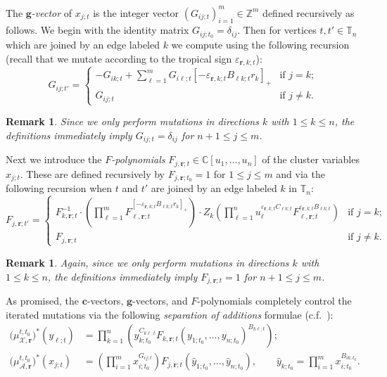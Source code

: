 \documentclass{amsart}
\newtheorem{remark}[theorem]{Remark}
\numberwithin{equation}{section}
\newcommand{\bfc}{\mathbf{c}}
\newcommand{\bfg}{\mathbf{g}}
\newcommand{\bfr}{{\boldsymbol{r}}}
\newcommand{\cA}{\mathcal{A}}
\newcommand{\cX}{\mathcal{X}}
\newcommand{\CC}{\mathbb{C}}
\newcommand{\TT}{\mathbb{T}}
\newcommand{\ZZ}{\mathbb{Z}}
\begin{document}
The \emph{$\bfg$-vector} of $x_{j;t}$ is the integer vector $(G_{ij;t})_{i=1}^m\in\ZZ^m$ defined recursively as follows.
We begin with the identity matrix $G_{ij;t_0}=\delta_{ij}$.
Then for vertices $t,t'\in\TT_n$ which are joined by an edge labeled $k$ we compute using the following recursion (recall that we mutate according to the tropical sign $\varepsilon_{\bfr,k;t}$):
\begin{equation}
  \label{eq:g-matrix mutation}
  G_{ij;t'}=
  \begin{cases}
    -G_{ik;t}+\sum\limits_{\ell=1}^m G_{i\ell;t}[-\varepsilon_{\bfr,k;t} B_{\ell k;t} r_k]_+ & \text{if $j=k$;}\\
    G_{ij;t} & \text{if $j\ne k$.}
  \end{cases}
\end{equation}
\begin{remark}
  Since we only perform mutations in directions $k$ with $1\le k\le n$, the definitions immediately imply $G_{ij;t}=\delta_{ij}$ for $n+1\le j\le m$.
\end{remark}
Next we introduce the \emph{$F$-polynomials} $F_{j,\bfr;t}\in\CC[u_1,\ldots,u_n]$ of the cluster variables $x_{j;t}$.
These are defined recursively by $F_{j,\bfr;t_0}=1$ for $1\le j\le m$ and via the following recursion when $t$ and $t'$ are joined by an edge labeled $k$ in $\TT_n$:
\begin{equation}
  \label{eq:F-polynomial mutation}
  F_{j,\bfr;t'}=
  \begin{cases}
    F_{k,\bfr;t}^{-1}\cdot \left(\prod_{\ell=1}^m F_{\ell,\bfr;t}^{[-\varepsilon_{\bfr,k;t} B_{\ell k;t} r_k]_+}\right) \cdot Z_k\left(\prod_{\ell=1}^n u_\ell^{\varepsilon_{\bfr,k;t} C_{\ell k;t}} F_{\ell,\bfr;t}^{\varepsilon_{\bfr,k;t} B_{\ell k;t}}\right) & \text{if $j=k$;}\\
    F_{j,\bfr;t} & \text{if $j\ne k$.}
  \end{cases}
\end{equation}
\begin{remark}
  Again, since we only perform mutations in directions $k$ with $1\le k\le n$, the definitions immediately imply $F_{j,\bfr;t}=1$ for $n+1\le j\le m$.
\end{remark}
As promised, the $\bfc$-vectors, $\bfg$-vectors, and $F$-polynomials completely control the iterated mutations via the following \emph{separation of additions} formulae (c.f.\ \cite{FZ07,Nak15,NR16}):
\begin{align}
  \label{eq:separation of additions 1}
  \big(\mu_{\cX,\bfr}^{t,t_0}\big)^*(y_{\ell;t})&=\prod_{k=1}^n \left( y_{k;t_0}^{C_{k\ell;t}} F_{k,\bfr;t}(y_{1;t_0},\ldots,y_{n;t_0})^{B_{k\ell;t}} \right);\\
  \label{eq:separation of additions 2}
  \big(\mu_{\cA,\bfr}^{t,t_0}\big)^*(x_{j;t})&=\left(\prod_{i=1}^m x_{i;t_0}^{G_{ij;t}}\right) F_{j,\bfr;t}(\hat y_{1;t_0},\ldots,\hat y_{n;t_0}),\qquad \hat y_{k;t_0}=\prod_{i=1}^m x_{i;t_0}^{B_{ik;t_0}}.
\end{align}
\end{document}
